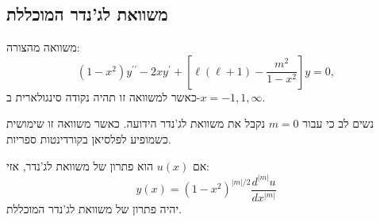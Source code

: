 \documentclass{tstextbook}
\begin{document}
\subsection{משוואת לג'נדר המוכללת}

\begin{definition}
משוואה מהצורה:
$$(1-x^{2})y^{\prime\prime}-2x y^{\prime}+\left[\ell(\ell+1)-\frac{m^{2}}{1-x^{2}}\right]y=0,$$
כאשר למשוואה זו תהיה נקודה סינגולארית ב-\(x=-1,1,\infty\).

\end{definition}
\begin{remark}
נשים לב כי עבור \(m=0\) נקבל את משוואת לג'נדר הידועה. כאשר משוואה זו שימושית כשמופיע לפלסיאן בקורדינטות ספריות.

\end{remark}
\begin{proposition}
אם \(u(x)\) הוא פתרון של משוואת לג'נדר, אזי:
$$y(x)=(1-x^{2})^{|m|/2}\frac{d^{|m|}u}{d x^{|m|}}$$
יהיה פתרון של משוואת לג'נדר המוכללת.

\end{proposition}
\end{document}
